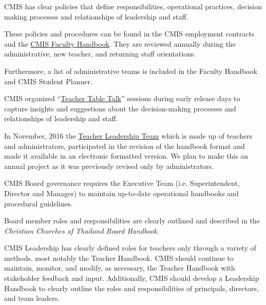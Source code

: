 \begin{findings}
CMIS has clear policies that define responsibilities, operational practices, decision making processes and relationships of leadership and staff. 

These policies and procedures can be found in the CMIS employment contracts and the \href{https://drive.google.com/a/cmis.ac.th/file/d/0ByVFfrm0zfolVm9uc19UNl82NVpPMUZ1ZEstZlFidEY1c2hn/view?usp=sharing}{CMIS Faculty Handbook}. They are reviewed annually during the administrative, new teacher, and returning staff orientations. 

Furthermore, a list of administrative teams is included in the Faculty Handbook and CMIS Student Planner. 

CMIS organized ``\href{https://drive.google.com/a/cmis.ac.th/file/d/0ByVFfrm0zfolbHNvSWhVWmJYU3M/view?usp=sharing}{Teacher Table Talk}'' sessions during early release days to capture insights and suggestions about the decision-making processes and relationships of leadership and staff. 

In November, 2016 the \href{https://docs.google.com/a/cmis.ac.th/document/d/1iW_tWIwRlWU2p0oIOvd3usDsxj9qYDt_2ROwNPBTHSc/edit?usp=sharing}{Teacher Leadership Team}  which is made up of teachers and administrators, participated in the revision of the handbook format and made it available in an electronic formatted version. We plan to make this an annual project as it was previously revised only by administrators.

CMIS Board governance requires the Executive Team (i.e. Superintendent, Director and Manager) to maintain up-to-date operational handbooks and procedural guidelines.

Board member roles and responsibilities are clearly outlined and described in the \textit{Christian Churches of Thailand Board Handbook}.


CMIS Leadership has clearly defined roles for teachers only through a variety of methods, most notably the Teacher Handbook. CMIS should continue to maintain, monitor, and modify, as necessary, the Teacher Handbook with stakeholder feedback and input. Additionally, CMIS should develop a Leadership Handbook to clearly outline the roles and responsibilities of principals, directors, and team leaders.
\end{findings}
